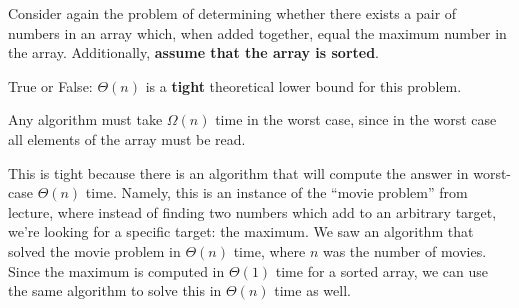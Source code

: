 
\begin{prob}
    Consider again the problem of determining whether there exists a pair of numbers
    in an array which, when added together, equal the maximum number in the array.
    Additionally, \textbf{assume that the array is sorted}.

    True or False: $\Theta(n)$ is a \textbf{tight} theoretical lower bound for this
    problem.

    \Tf{}

    \begin{soln}
        Any algorithm must take $\Omega(n)$ time in the worst case, since in the worst
        case all elements of the array must be read.

        This is tight because there is an algorithm that will compute the answer in
        worst-case $\Theta(n)$ time. Namely, this is an instance of the ``movie problem''
        from lecture, where instead of finding two numbers which add to an arbitrary
        target, we're looking for a specific target: the maximum. We saw an algorithm
        that solved the movie problem in $\Theta(n)$ time, where $n$ was the number of
        movies.
        Since the maximum
        is computed in $\Theta(1)$ time for a sorted array, we can use the same algorithm
        to solve this in $\Theta(n)$ time as well.
    \end{soln}

\end{prob}
